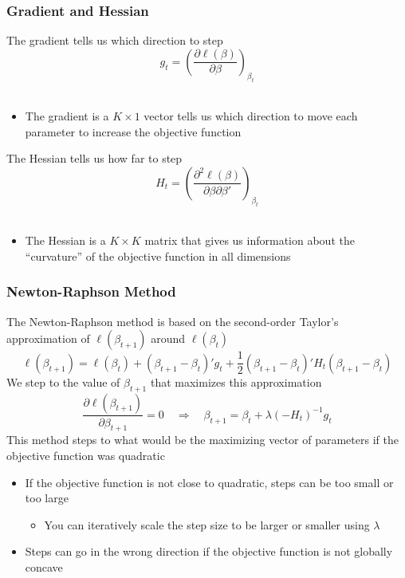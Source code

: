 \documentclass{beamer}
\begin{document}
\begin{frame}\frametitle{Gradient and Hessian}
    The gradient tells us which direction to step
    $$g_t = \left( \frac{\partial \ell(\beta)}{\partial \beta} \right)_{\beta_t}$$ \\
    \begin{itemize}
        \item The gradient is a $K \times 1$ vector tells us which direction to move each parameter to increase the objective function
    \end{itemize}
    \vspace{3ex}
    The Hessian tells us how far to step
    $$H_t = \left( \frac{\partial^2 \ell(\beta)}{\partial \beta \partial \beta'} \right)_{\beta_t}$$ \\
    \begin{itemize}
        \item The Hessian is a $K \times K$ matrix that gives us information about the ``curvature'' of the objective function in all dimensions
    \end{itemize}
\end{frame}

\begin{frame}\frametitle{Newton-Raphson Method}
    The Newton-Raphson method is based on the second-order Taylor's approximation of $\ell(\beta_{t + 1})$ around $\ell(\beta_t)$
    $$\ell(\beta_{t + 1}) = \ell(\beta_t) + (\beta_{t + 1} - \beta_t)' g_t + \frac{1}{2} (\beta_{t + 1} - \beta_t)' H_t (\beta_{t + 1} - \beta_t)$$
    We step to the value of $\beta_{t + 1}$ that maximizes this approximation
    $$\frac{\partial \ell(\beta_{t + 1})}{\partial \beta_{t + 1}} = 0 \quad \Rightarrow \quad \beta_{t + 1} = \beta_t + \lambda (-H_t)^{-1} g_t$$
    This method steps to what would be the maximizing vector of parameters if the objective function was quadratic
    \begin{itemize}
        \item If the objective function is not close to quadratic, steps can be too small or too large
        \begin{itemize}
            \item You can iteratively scale the step size to be larger or smaller using $\lambda$
        \end{itemize}
        \item Steps can go in the wrong direction if the objective function is not globally concave
    \end{itemize}
\end{frame}
\end{document}
